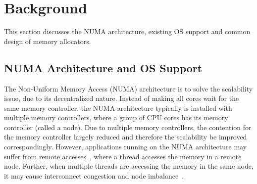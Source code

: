 \section{Background}
\label{sec:background}

This section discusses the NUMA architecture, existing OS support and common design of memory allocators.

\subsection{NUMA Architecture and OS Support}

\label{sec:numa}


The Non-Uniform Memory Access (NUMA) architecture is  to solve the scalability issue, due to its decentralized nature. Instead of making all cores wait for the same memory controller, the NUMA architecture typically is installed with multiple memory controllers, where a group of CPU cores has its memory controller (called a node). 
Due to multiple memory controllers, the contention for the memory controller  largely reduced and therefore the scalability  be improved correspondingly. However, applications running on the NUMA architecture may suffer from remote accesses~\cite{Blagodurov:2011:CNC:2002181.2002182}, where a thread accesses the memory in a remote node. Further, when multiple threads are accessing the memory in the same node, it may cause interconnect congestion and node imbalance~\cite{Blagodurov:2011:CNC:2002181.2002182}.  

 
